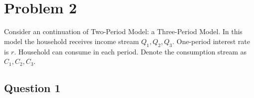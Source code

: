 \documentclass[11pt, oneside]{article}
\begin{document}
\clearpage
\section*{Problem 2}
Consider an continuation of Two-Period Model: a Three-Period Model. In this model the household
receives income stream $ Q_{1}, Q_{2}, Q_{3} $. One-period interest rate is $ r $. Household can consume in each period.
Denote the consumption stream as $ C_{1}, C_{2}, C_{3} $.
\subsection*{Question 1}
\end{document}
